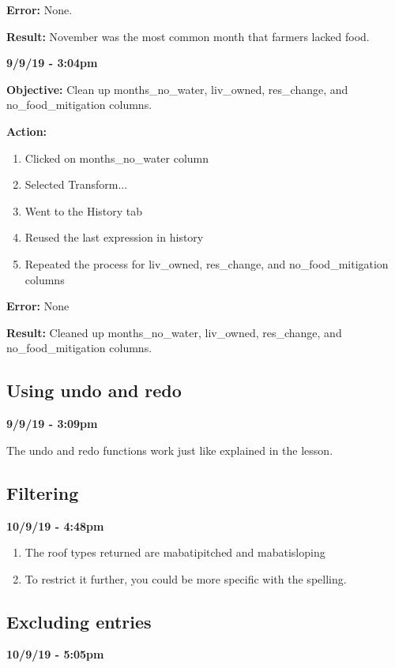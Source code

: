 \documentclass{article}
\begin{document}
\textbf{Error:} None.

\textbf{Result:} November was the most common month that farmers lacked food.

\textbf{9/9/19 - 3:04pm}

\textbf{Objective:} Clean up months\_no\_water, liv\_owned, res\_change, and no\_food\_mitigation columns.

\textbf{Action:}

\begin{enumerate}
    \item Clicked on months\_no\_water column
    \item Selected Transform...
    \item Went to the History tab
    \item Reused the last expression in history
    \item Repeated the process for liv\_owned, res\_change, and no\_food\_mitigation columns
\end{enumerate}

\textbf{Error:} None

\textbf{Result:} Cleaned up months\_no\_water, liv\_owned, res\_change, and no\_food\_mitigation columns.

\subsection{Using undo and redo}

\textbf{9/9/19 - 3:09pm}

The undo and redo functions work just like explained in the lesson.

\subsection{Filtering}

\textbf{10/9/19 - 4:48pm}

\begin{enumerate}
    \item The roof types returned are mabatipitched and mabatisloping
    \item To restrict it further, you could be more specific with the spelling.
\end{enumerate}

\subsection{Excluding entries}

\textbf{10/9/19 - 5:05pm}
\end{document}
